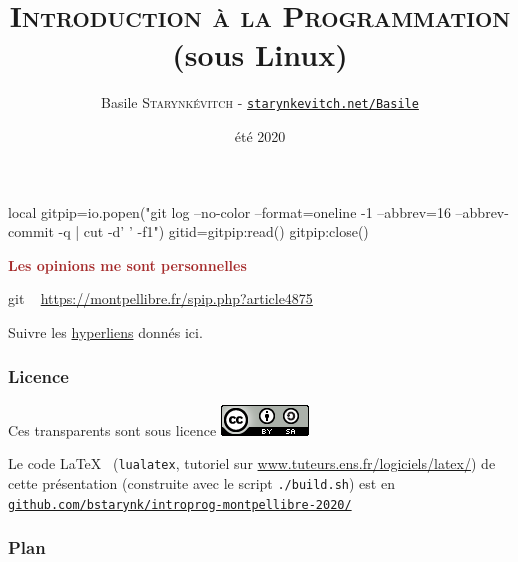 \documentclass[xcolor=svgnames,final,smaller,a4]{beamer}
\title{\textsc{Introduction à la Programmation} \\
(sous Linux)}
\author[B.Starynkevitch]{Basile \textsc{Starynkévitch} - \href{http://starynkevitch.net/Basile/}{\texttt{starynkevitch.net/Basile}}\\ \href{mailto:basile@starynkevitch.net}{\color{blue}{\texttt{basile@starynkevitch.net}}}
} %
\institute{MontPellibre (Montpellier)}
\date{été 2020}
\begin{document}
 \begin{luacode*}
   local gitpip=io.popen("git log --no-color --format=oneline -1 --abbrev=16 --abbrev-commit -q | cut -d' ' -f1")
   gitid=gitpip:read()
   gitpip:close()
 \end{luacode*}
  \newcommand{\mygitid}{\luadirect{tex.print(gitid)}}

 \begin{frame}
   
   
   \begin{relsize}{-1.5}
        \titlepage
        \textcolor{brown}{{\large \textbf{Les opinions me sont personnelles}} }
        
        \begin{center}
          git \texttt{\mygitid} ~ 
          \href{https://montpellibre.fr/spip.php?article4875}{https://montpellibre.fr/spip.php?article4875}

          Suivre les \href{https://fr.wikipedia.org/wiki/Hyperlien}{hyperliens} donnés ici.
        \end{center}
   \end{relsize}
\end{frame}

 \begin{frame}
    \frametitle{Licence}
    
    Ces transparents sont sous licence \href{https://creativecommons.org/licenses/by-sa/4.0/}{\includegraphics[scale=0.75]{CC-BY-SA-4}} 

    \vspace{1cm} Le code \LaTeX ~ (\texttt{lualatex}, tutoriel sur \href{https://www.tuteurs.ens.fr/logiciels/latex/}{www.tuteurs.ens.fr/logiciels/latex/}) de cette
    présentation (construite avec le script \texttt{./build.sh}) est
    en
    \href{https://github.com/bstarynk/introprog-montpellibre-2020/}{\texttt{github.com/bstarynk/introprog-montpellibre-2020/}}
 \end{frame}
 
 \begin{frame}
    \frametitle{Plan}
    
   \tableofcontents
 \end{frame}


\end{document}
